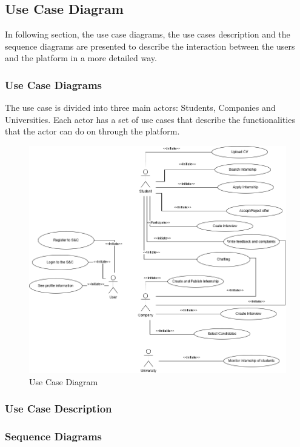 \subsection{Use Case Diagram}
In following section, the use case diagrams, the use cases description and the sequence diagrams are presented to describe 
the interaction between the users and the platform in a more detailed way.

\subsubsection{Use Case Diagrams}
The use case is divided into three main actors: Students, Companies and Universities. Each actor has a set of use cases that
describe the functionalities that the actor can do on through the platform.
\begin{figure}[H]
    \centering
    \includegraphics[width=1\textwidth]{Images/Use_Cases _Diagram.png}
    \caption{Use Case Diagram}
\end{figure}

\subsubsection{Use Case Description}
\subsubsection{Sequence Diagrams}

